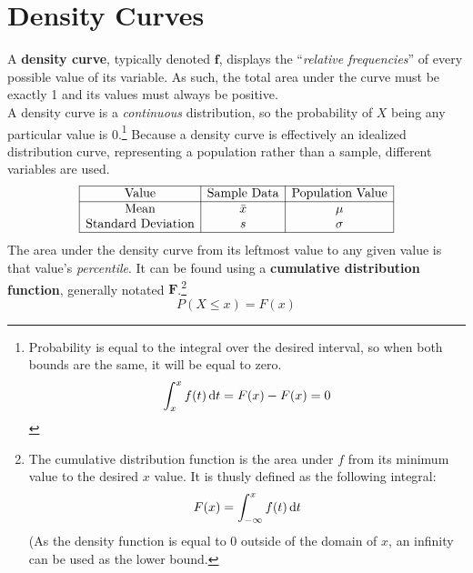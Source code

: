 \documentclass[../AP_Statistics.tex]{subfiles}
\begin{document}
		\section{Density Curves}
			A \textbf{density curve}, typically denoted $\pmb{f}$, displays the \enquote{\emph{relative frequencies}} of every possible value of its variable. As such, the total area under the curve must be exactly 1 and its values must always be positive. \\ 
			A density curve is a \emph{continuous} distribution, so the probability of $X$ being any particular value is 0.\footnote{Probability is equal to the integral over the desired interval, so when both bounds are the same, it will be equal to zero.\[\int_x^xf(t)\,\mathrm{d} t = F(x) - F(x) = 0\]}
			Because a density curve is effectively an idealized distribution curve, representing a population rather than a sample, different variables are used. \\ 
			\[\begin{array}{|c|c|c|}\hline
				\rm{Value} & \text{Sample Data} & \text{Population Value} \\\hline
				\rm{Mean} & \bar{x} & \mu \\
				\text{Standard Deviation} & s & \sigma \\\hline
			\end{array}\]
			The area under the density curve from its leftmost value to any given value is that value's \emph{percentile}. It can be found using a \textbf{cumulative distribution function}, generally notated $\pmb{F}$.\footnote{The cumulative distribution function is the area under $f$ from its minimum value to the desired $x$ value. It is thusly defined as the following integral:\[F(x) = \int_{-\infty}^xf(t)\,\mathrm{d} t\](As the density function is equal to 0 outside of the domain of $x$, an infinity can be used as the lower bound.}
			\[P(X \le x) = F(x)\]
\end{document}
